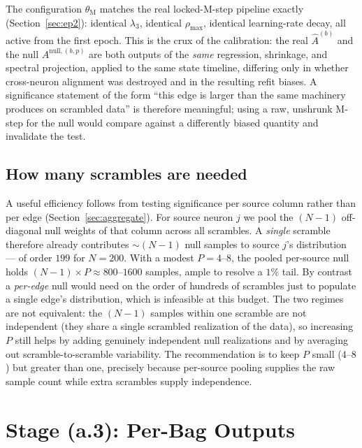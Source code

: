 \documentclass[11pt]{article}
\begin{document}
The configuration \(\theta_{\text{M}}\) matches the real locked-M-step
pipeline exactly (Section~\ref{sec:ep2}): identical \(\lambda_3\),
identical \(\rho_{\max}\), identical learning-rate decay, all active from
the first epoch. This is the crux of the calibration: the real
\(\hat A^{(b)}\) and the null
\(A^{\text{null},(b,p)}\) are both outputs of the \emph{same} regression,
shrinkage, and spectral projection, applied to the same state timeline,
differing only in whether cross-neuron alignment was destroyed and in the
resulting refit biases. A
significance statement of the form ``this edge is larger than the same
machinery produces on scrambled data'' is therefore meaningful; using a raw,
unshrunk M-step for the null would compare against a differently biased
quantity and invalidate the test.

\subsection{How many scrambles are needed}
\label{sec:howmanyscrambles}

A useful efficiency follows from testing significance per source column
rather than per edge (Section~\ref{sec:aggregate}). For source neuron \(j\)
we pool the \((N-1)\) off-diagonal null weights of that column across all
scrambles. A \emph{single} scramble therefore already contributes
\(\sim(N-1)\) null samples to source \(j\)'s distribution --- of order
\(199\) for \(N=200\). With a modest \(P=4\)--\(8\), the pooled per-source
null holds \((N-1)\times P\approx800\)--\(1600\) samples, ample to resolve a
\(1\%\) tail. By contrast a \emph{per-edge} null would need on the order of
hundreds of scrambles just to populate a single edge's distribution, which
is infeasible at this budget. The two regimes are not equivalent: the
\((N-1)\) samples within one scramble are not independent (they share a
single scrambled realization of the data), so increasing \(P\) still helps
by adding genuinely independent null realizations and by averaging out
scramble-to-scramble variability. The recommendation is to keep \(P\) small
(\(4\)--\(8\)) but greater than one, precisely because per-source pooling
supplies the raw sample count while extra scrambles supply independence.

\section{Stage (a.3): Per-Bag Outputs}
\label{sec:bagout}
\end{document}
